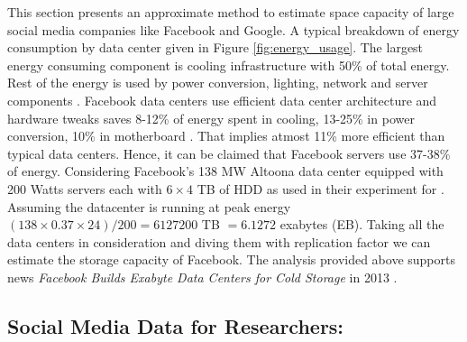 This section presents an approximate method to estimate space capacity of large social media companies like Facebook and Google.
A typical breakdown of energy consumption by data center given in Figure \ref{fig:energy_usage}.
The largest energy consuming component is cooling infrastructure with 50\% of total energy. Rest of the energy is used by power conversion, lighting, network and server components \cite{info2007top, dayarathna2016data}. Facebook data centers use efficient data center architecture and hardware tweaks  saves
8-12\% of energy spent in cooling, 13-25\% in power conversion, 10\% in motherboard \cite{frachtenberg2011high}. That implies atmost 11\%  more efficient than typical data centers. Hence, it can be claimed that Facebook servers use 37-38\% of energy. Considering Facebook's 138 MW Altoona data center equipped with 200 Watts servers each with $6\times4$ TB of HDD as used in their experiment for \cite{frachtenberg2011high}. Assuming the datacenter is running at peak energy $(138 \times 0.37 \times 24)/ 200 = 6127200$  TB $= 6.1272$ exabytes (EB).
Taking all the data centers in consideration and diving them with replication factor we can estimate the storage capacity of Facebook. The analysis provided above supports news {\em Facebook Builds Exabyte Data Centers for Cold Storage} in 2013 \cite{facebook_support}.


\subsection*{Social Media Data for Researchers:}



